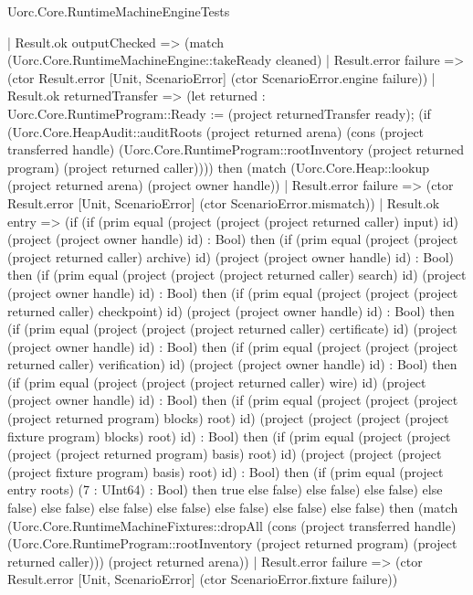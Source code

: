 \begin{lexlean}{Uorc.Core.RuntimeMachineEngineTests}
\begin{semanticmodule}
{                            | Result.ok outputChecked => (match (Uorc.Core.RuntimeMachineEngine::takeReady cleaned)
                              | Result.error failure => (ctor Result.error [Unit, ScenarioError] (ctor ScenarioError.engine failure))
                              | Result.ok returnedTransfer => (let returned : Uorc.Core.RuntimeProgram::Ready := (project returnedTransfer ready); (if (Uorc.Core.HeapAudit::auditRoots (project returned arena) (cons (project transferred handle) (Uorc.Core.RuntimeProgram::rootInventory (project returned program) (project returned caller)))) then (match (Uorc.Core.Heap::lookup (project returned arena) (project owner handle))
                                | Result.error failure => (ctor Result.error [Unit, ScenarioError] (ctor ScenarioError.mismatch))
                                | Result.ok entry => (if (if (prim equal (project (project (project returned caller) input) id) (project (project owner handle) id) : Bool) then (if (prim equal (project (project (project returned caller) archive) id) (project (project owner handle) id) : Bool) then (if (prim equal (project (project (project returned caller) search) id) (project (project owner handle) id) : Bool) then (if (prim equal (project (project (project returned caller) checkpoint) id) (project (project owner handle) id) : Bool) then (if (prim equal (project (project (project returned caller) certificate) id) (project (project owner handle) id) : Bool) then (if (prim equal (project (project (project returned caller) verification) id) (project (project owner handle) id) : Bool) then (if (prim equal (project (project (project returned caller) wire) id) (project (project owner handle) id) : Bool) then (if (prim equal (project (project (project (project returned program) blocks) root) id) (project (project (project (project fixture program) blocks) root) id) : Bool) then (if (prim equal (project (project (project (project returned program) basis) root) id) (project (project (project (project fixture program) basis) root) id) : Bool) then (if (prim equal (project entry roots) (7 : UInt64) : Bool) then true else false) else false) else false) else false) else false) else false) else false) else false) else false) else false) then (match (Uorc.Core.RuntimeMachineFixtures::dropAll (cons (project transferred handle) (Uorc.Core.RuntimeProgram::rootInventory (project returned program) (project returned caller))) (project returned arena))
                                  | Result.error failure => (ctor Result.error [Unit, ScenarioError] (ctor ScenarioError.fixture failure))
}
\end{semanticmodule}
\end{lexlean}
